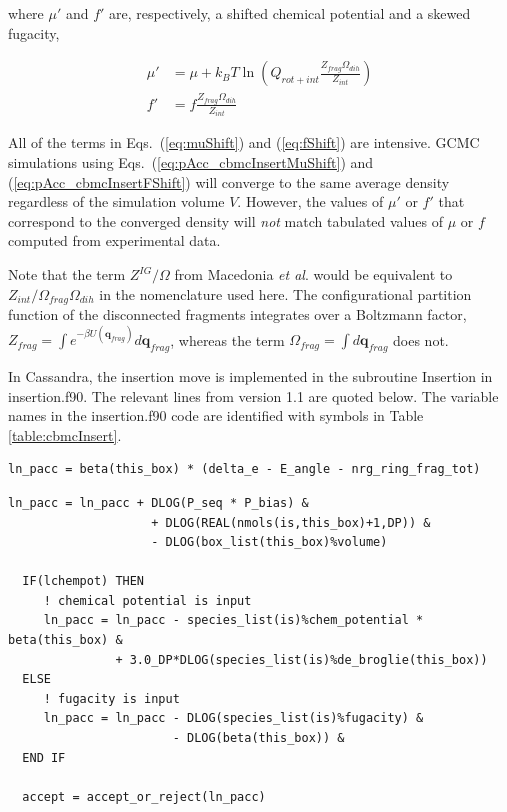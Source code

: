 where $\mu'$ and $f'$ are, respectively, a shifted chemical potential and a skewed fugacity,

\begin{align}
\label{eq:muShift}
\mu'&=\mu+k_BT\ln\left( Q_{rot+int} \frac{Z_{frag}\Omega_{dih}}{Z_{int}} \right) \\
\label{eq:fShift}
f'&= f \frac{Z_{frag}\Omega_{dih}}{Z_{int}}
\end{align}

All of the terms in Eqs.\ (\ref{eq:muShift}) and (\ref{eq:fShift}) are intensive. GCMC simulations using Eqs.\ (\ref{eq:pAcc_cbmcInsertMuShift}) and (\ref{eq:pAcc_cbmcInsertFShift}) will converge to the same average density regardless of the simulation volume $V$. However, the values of $\mu'$ or $f'$ that correspond to the converged density will {\em not} match tabulated values of $\mu$ or $f$ computed from experimental data.

Note that the term $Z^{IG}/\Omega$ from Macedonia {\em et al}. would be equivalent to $Z_{int}/\Omega_{frag}\Omega_{dih}$ in the nomenclature used here. The configurational partition function of the disconnected fragments integrates over a Boltzmann factor, $Z_{frag} = \int e^{-\beta U(\mathbf{q}_{frag})} d\mathbf{q}_{frag}$, whereas the term $\Omega_{frag} = \int d\mathbf{q}_{frag}$ does not.

In Cassandra, the insertion move is implemented in the subroutine Insertion in insertion.f90. The relevant lines from version 1.1 are quoted below. The variable names in the insertion.f90 code are identified with symbols in Table \ref{table:cbmcInsert}.

\begin{minipage}{\linewidth}
\begin{lstlisting}[firstnumber=441, caption=insertion.f90]
  ln_pacc = beta(this_box) * (delta_e - E_angle - nrg_ring_frag_tot)
\end{lstlisting}
\begin{lstlisting}[firstnumber=447]
  ln_pacc = ln_pacc + DLOG(P_seq * P_bias) &
                    + DLOG(REAL(nmols(is,this_box)+1,DP)) &
                    - DLOG(box_list(this_box)%volume)

  IF(lchempot) THEN
     ! chemical potential is input
     ln_pacc = ln_pacc - species_list(is)%chem_potential * beta(this_box) &
               + 3.0_DP*DLOG(species_list(is)%de_broglie(this_box))
  ELSE   
     ! fugacity is input
     ln_pacc = ln_pacc - DLOG(species_list(is)%fugacity) &
                       - DLOG(beta(this_box)) &
  END IF 

  accept = accept_or_reject(ln_pacc)
\end{lstlisting}
\end{minipage}

